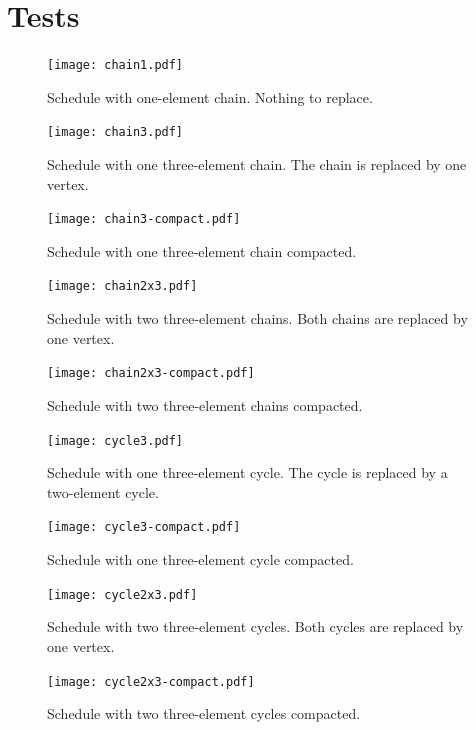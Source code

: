 \documentclass[12pt,a4paper]{report}
\begin{document}
\chapter{Tests}
    \begin{figure}
        \centering
        \texttt{[image: chain1.pdf]}
        \caption{Schedule with one-element chain. Nothing to replace.}
        \label{fig:chain1}
    \end{figure}
    \begin{figure}
        \centering
        \texttt{[image: chain3.pdf]}
        \caption{Schedule with one three-element chain. The chain is replaced by one vertex.}
        \label{fig:chain3}
    \end{figure}
    \begin{figure}
        \centering
        \texttt{[image: chain3-compact.pdf]}
        \caption{Schedule with one three-element chain compacted.}
        \label{fig:chain3-compact}
    \end{figure}
    \begin{figure}
        \centering
        \texttt{[image: chain2x3.pdf]}
        \caption{Schedule with two three-element chains. Both chains are replaced by one vertex.}
        \label{fig:chain2x3}
    \end{figure}
    \begin{figure}
        \centering
        \texttt{[image: chain2x3-compact.pdf]}
        \caption{Schedule with two three-element chains compacted.}
        \label{fig:chain2x3-compact}
    \end{figure}
    \begin{figure}
        \centering
        \texttt{[image: cycle3.pdf]}
        \caption{Schedule with one three-element cycle. The cycle is replaced by a two-element cycle.}
        \label{fig:cycle3}
    \end{figure}
    \begin{figure}
        \centering
        \texttt{[image: cycle3-compact.pdf]}
        \caption{Schedule with one three-element cycle compacted.}
        \label{fig:cycle3-compact}
    \end{figure}
    \begin{figure}
        \centering
        \texttt{[image: cycle2x3.pdf]}
        \caption{Schedule with two three-element cycles. Both cycles are replaced by one vertex.}
        \label{fig:cycle2x3}
    \end{figure}
    \begin{figure}
        \centering
        \texttt{[image: cycle2x3-compact.pdf]}
        \caption{Schedule with two three-element cycles compacted.}
        \label{fig:cycle2x3-compact}
    \end{figure}
\end{document}
